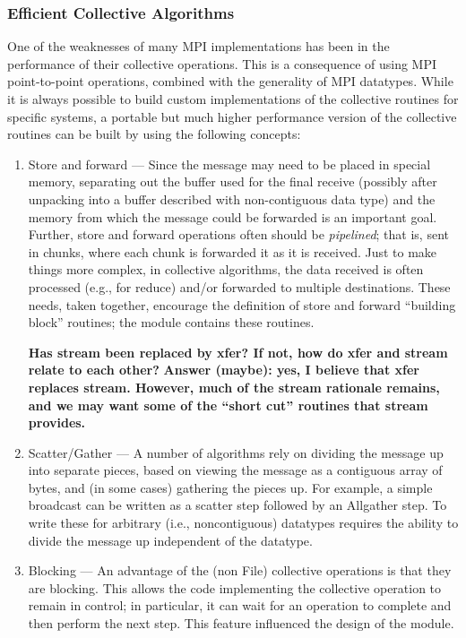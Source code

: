 \documentclass{article}
\begin{document}
\subsubsection{Efficient Collective Algorithms}
One of the weaknesses of many MPI implementations has been in the
performance of their collective operations.  This is a consequence of
using MPI point-to-point operations, combined with the generality of
MPI datatypes.  While it is always possible to build custom
implementations of the collective routines for specific systems, a
portable but much higher performance version of the collective
routines can be built by using the following concepts:
\begin{enumerate}
\item Store and forward --- Since the message may need to be placed in
special memory, separating out the buffer used for the final receive
(possibly after unpacking into a buffer described with non-contiguous
data type) and the memory from which the message could be forwarded is
an important goal.  Further, store and
forward operations often should be \emph{pipelined}; that is, sent in
chunks, where each chunk is forwarded it as it is received.
Just to make things more complex, in collective algorithms, the data
received is often processed (e.g., for reduce) and/or forwarded to
multiple destinations.  These needs, taken together, encourage the
definition of store and forward ``building block'' routines; the 
module contains these routines.

\textbf{Has stream been replaced by xfer?  If not, how do xfer and
stream relate to each other?}
\textbf{Answer (maybe): yes, I believe that xfer replaces stream.
However, much of the stream rationale remains, and we may want some of
the ``short cut'' routines that stream provides.}

\item Scatter/Gather --- A number of algorithms rely on dividing the
message up into separate pieces, based on viewing the message as a
contiguous array of bytes, and (in some cases) gathering the pieces
up.  For example, a simple broadcast can be written as a scatter step
followed by an Allgather step.  To write these for arbitrary (i.e.,
noncontiguous) datatypes requires the ability to divide the message up
independent of the datatype.  

\item Blocking --- An advantage of the (non File) collective
operations is that they are blocking.  This allows the code
implementing the collective operation to remain in control; in
particular, it can wait for an operation to complete and then perform
the next step.  This feature influenced the design of the
 module.
\end{enumerate}
\end{document}
